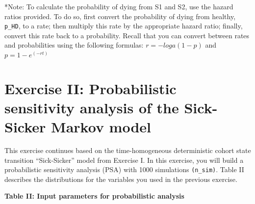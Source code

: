 \documentclass[
]{article}
\begin{document}
*Note: To calculate the probability of dying from S1 and S2, use the
hazard ratios provided. To do so, first convert the probability of dying
from healthy, \texttt{p\_HD}, to a rate; then multiply this rate by the
appropriate hazard ratio; finally, convert this rate back to a
probability. Recall that you can convert between rates and probabilities
using the following formulas: \(r = -loga(1-p)\) and \(p = 1-e^{(-rt)}\)

\newpage

\hypertarget{exercise-ii-probabilistic-sensitivity-analysis-of-the-sick-sicker-markov-model}{%
\section{Exercise II: Probabilistic sensitivity analysis of the
Sick-Sicker Markov
model}\label{exercise-ii-probabilistic-sensitivity-analysis-of-the-sick-sicker-markov-model}}

This exercise continues based on the time-homogeneous deterministic
cohort state transition ``Sick-Sicker'' model from Exercise I. In this
exercise, you will build a probabilistic sensitivity analysis (PSA) with
1000 simulations \texttt{(n\_sim)}. Table II describes the distributions
for the variables you used in the previous exercise.

\textbf{Table II: Input parameters for probabilistic analysis}
\end{document}
